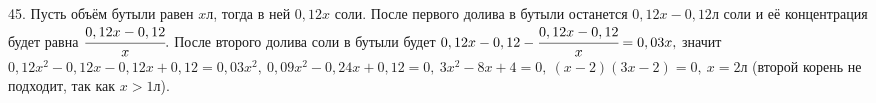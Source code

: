 45. Пусть объём бутыли равен $x$л, тогда в ней $0,12x$ соли. После первого долива в бутыли останется $0,12x-0,12$л соли и её концентрация будет равна $\cfrac{0,12x-0,12}{x}.$ После второго долива соли в бутыли будет $0,12x-0,12-\cfrac{0,12x-0,12}{x}=0,03x,$ значит $0,12x^2-0,12x-0,12x+0,12=0,03x^2,\ 0,09x^2-0,24x+0,12=0,\ 3x^2-8x+4=0,\ (x-2)(3x-2)=0,\ x=2$л (второй корень не подходит, так как $x>1$л).\\
